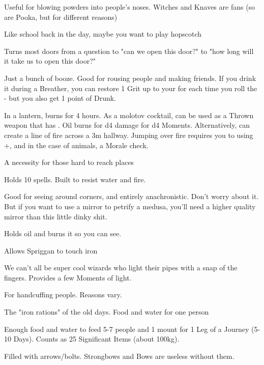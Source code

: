 {\begin{multicols}{2}
   Useful for blowing powders into people's noses.  Witches and Knaves are fans (so are Pooka, but for different reasons)
  
   Like school back in the day, maybe you want to play hopscotch
  
   Turns most doors from a question to "can we open this door?" to "how long will it take us to open this door?"
  
   Just a bunch of booze. Good for rousing people and making friends. If you drink it during a Breather, you can restore 1 Grit up to your \MAX for each time you roll the \UD - but you also get 1 point of Drunk.
  
   In a lantern, burns for 4 hours. As a molotov cocktail, can be used as a Thrown weapon that has  .  Oil burns for d4 damage for d4 Moments. Alternatively, can create a line of fire across a 3m hallway. Jumping over fire requires you to \RO using \MD+\DEX, and in the case of animals, a Morale check. 
  
   A necessity for those hard to reach places
  
   Holds 10 spells. Built to resist water and fire.

\cbreak
  
   Good for seeing around corners, and entirely anachronistic. Don't worry about it. But if you want to use a mirror to petrify a medusa,  you'll need a higher quality mirror than this little dinky shit.
  
   Holds oil and burns it so you can see.
  
   Allows Spriggan to touch iron
  
   We can't all be super cool wizards who light their pipes with a snap of the fingers.  Provides a few Moments of light.
  
   For handcuffing people.  Reasons vary.
  
   The "iron rations" of the old days.  Food and water for one person

   Enough food and water to feed 5-7 people and 1 mount for 1 Leg of a Journey (5-10 Days).  Counts as 25 Significant Items (about 100kg).
  
   Filled with arrows/bolts.  Strongbows and Bows are useless without them.
  

\end{multicols}}
